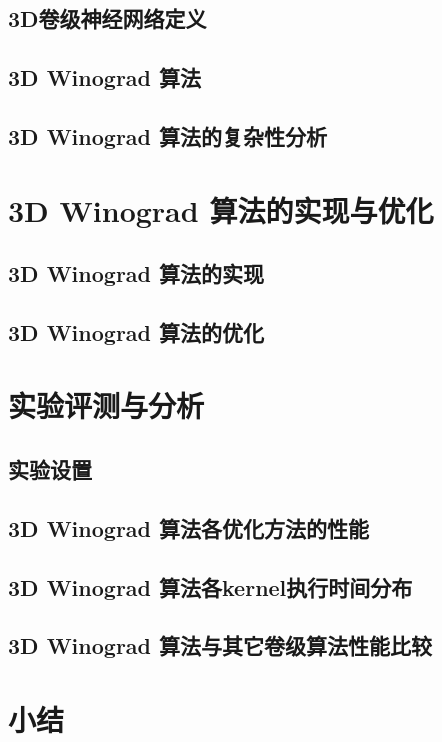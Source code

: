 \subsection{3D卷级神经网络定义}

\subsection{3D Winograd 算法}

\subsection{3D Winograd 算法的复杂性分析}


\section{3D Winograd 算法的实现与优化}

\subsection{3D Winograd 算法的实现}

\subsection{3D Winograd 算法的优化}


\section{实验评测与分析}
\subsection{实验设置}


\subsection{3D Winograd 算法各优化方法的性能}


\subsection{3D Winograd 算法各kernel执行时间分布}


\subsection{3D Winograd 算法与其它卷级算法性能比较}


\section{小结}

